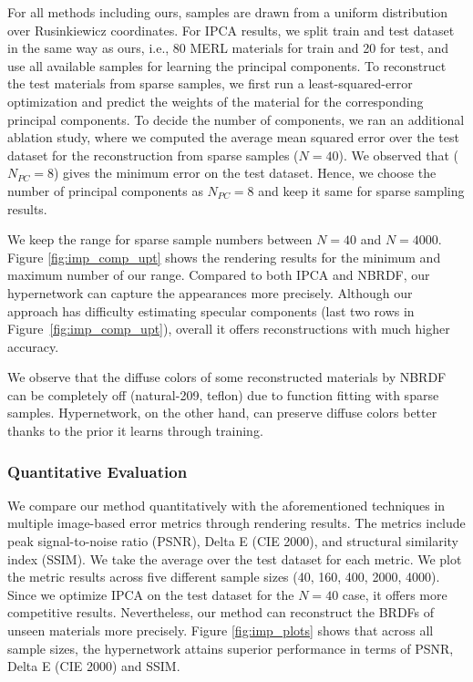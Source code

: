 For all methods including ours, samples are drawn from a uniform distribution over Rusinkiewicz coordinates. For IPCA results, we split train and test dataset in the same way as ours, i.e., 80 MERL materials for train and 20 for test, and use all available samples for learning the principal components. To reconstruct the test materials from sparse samples, we first run a least-squared-error optimization and predict the weights of the material for the corresponding principal components. To decide the number of components, we ran an additional ablation study, where 
we computed the average mean squared error over the test dataset for the reconstruction from sparse samples ($N = 40$). We observed that ($N_{PC} = 8$) gives the minimum error on the test dataset. Hence, we choose the number of principal components as $N_{PC} = 8$ and keep it same for sparse sampling results.

 
We keep the range for sparse sample numbers between $N = 40$ and $N = 4000$. Figure \ref{fig:imp_comp_upt} shows the rendering results for the minimum and maximum number of our range. Compared to both IPCA and NBRDF, our hypernetwork can capture the appearances more precisely. Although our approach has difficulty estimating specular components (last two rows in Figure~\ref{fig:imp_comp_upt}), overall it offers reconstructions with much higher accuracy.

We observe that the diffuse colors of some reconstructed materials by NBRDF can be completely off (natural-209, teflon) due to function fitting with sparse samples. Hypernetwork, on the other hand, can preserve diffuse colors better thanks to the prior it learns through training.


\subsubsection{Quantitative Evaluation}

We compare our method quantitatively with the aforementioned techniques in multiple image-based error metrics through rendering results. The metrics include peak signal-to-noise ratio (PSNR), Delta E (CIE 2000), and structural similarity index (SSIM). We take the average over the test dataset for each metric. We plot the metric results across five different sample sizes (40, 160, 400, 2000, 4000). Since we optimize IPCA on the test dataset for the $N = 40$ case, it offers more competitive results. Nevertheless, our method can reconstruct the BRDFs of unseen materials more precisely. Figure \ref{fig:imp_plots} shows that across all sample sizes, the hypernetwork attains superior performance in terms of PSNR, Delta E (CIE 2000) and SSIM. 

